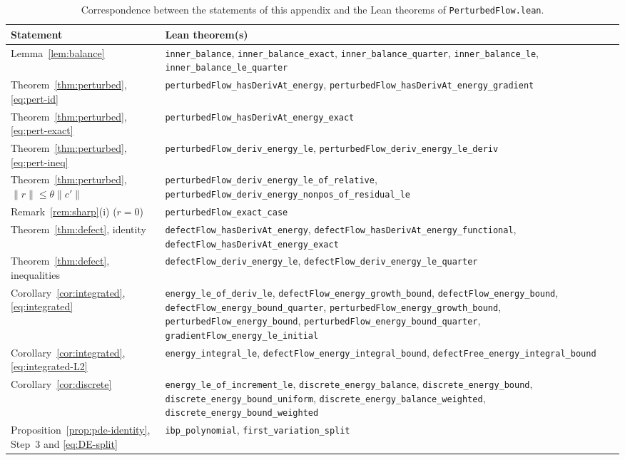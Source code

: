 \begin{table}[H]
\caption{Correspondence between the statements of this appendix and the Lean theorems of \texttt{PerturbedFlow.lean}.\label{tab:lean-perturbed}}
\small
\begin{tabularx}{\textwidth}{l>{\raggedright\arraybackslash}X}
\toprule
\textbf{Statement} & \textbf{Lean theorem(s)}\\
\midrule
Lemma~\ref{lem:balance} & \texttt{inner\_balance}, \texttt{inner\_balance\_exact}, \texttt{inner\_balance\_quarter}, \texttt{inner\_balance\_le}, \texttt{inner\_balance\_le\_quarter}\\
Theorem~\ref{thm:perturbed}, \eqref{eq:pert-id} & \texttt{perturbedFlow\_hasDerivAt\_energy}, \texttt{perturbedFlow\_hasDerivAt\_energy\_gradient}\\
Theorem~\ref{thm:perturbed}, \eqref{eq:pert-exact} & \texttt{perturbedFlow\_hasDerivAt\_energy\_exact}\\
Theorem~\ref{thm:perturbed}, \eqref{eq:pert-ineq} & \texttt{perturbedFlow\_deriv\_energy\_le}, \texttt{perturbedFlow\_deriv\_energy\_le\_deriv}\\
Theorem~\ref{thm:perturbed}, $\|r\|\le\theta\|c'\|$ & \texttt{perturbedFlow\_deriv\_energy\_le\_of\_relative}, \texttt{perturbedFlow\_deriv\_energy\_nonpos\_of\_residual\_le}\\
Remark~\ref{rem:sharp}(i) ($r=0$) & \texttt{perturbedFlow\_exact\_case}\\
Theorem~\ref{thm:defect}, identity & \texttt{defectFlow\_hasDerivAt\_energy}, \texttt{defectFlow\_hasDerivAt\_energy\_functional}, \texttt{defectFlow\_hasDerivAt\_energy\_exact}\\
Theorem~\ref{thm:defect}, inequalities & \texttt{defectFlow\_deriv\_energy\_le}, \texttt{defectFlow\_deriv\_energy\_le\_quarter}\\
Corollary~\ref{cor:integrated}, \eqref{eq:integrated} & \texttt{energy\_le\_of\_deriv\_le}, \texttt{defectFlow\_energy\_growth\_bound}, \texttt{defectFlow\_energy\_bound}, \texttt{defectFlow\_energy\_bound\_quarter}, \texttt{perturbedFlow\_energy\_growth\_bound}, \texttt{perturbedFlow\_energy\_bound}, \texttt{perturbedFlow\_energy\_bound\_quarter}, \texttt{gradientFlow\_energy\_le\_initial}\\
Corollary~\ref{cor:integrated}, \eqref{eq:integrated-L2} & \texttt{energy\_integral\_le}, \texttt{defectFlow\_energy\_integral\_bound}, \texttt{defectFree\_energy\_integral\_bound}\\
Corollary~\ref{cor:discrete} & \texttt{energy\_le\_of\_increment\_le}, \texttt{discrete\_energy\_balance}, \texttt{discrete\_energy\_bound}, \texttt{discrete\_energy\_bound\_uniform}, \texttt{discrete\_energy\_balance\_weighted}, \texttt{discrete\_energy\_bound\_weighted}\\
Proposition~\ref{prop:pde-identity}, Step~3 and \eqref{eq:DE-split} & \texttt{ibp\_polynomial}, \texttt{first\_variation\_split}\\
\bottomrule
\end{tabularx}
\end{table}

